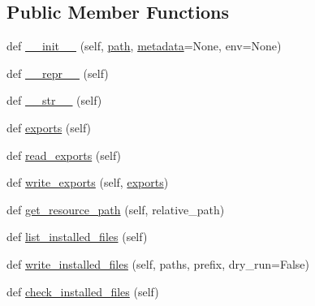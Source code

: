 \subsection*{Public Member Functions}
\begin{DoxyCompactItemize}
\item 
def \hyperlink{classpip_1_1__vendor_1_1distlib_1_1database_1_1InstalledDistribution_abbce5ce033af82ea6ee5f8986284c84b}{\+\_\+\+\_\+init\+\_\+\+\_\+} (self, \hyperlink{classpip_1_1__vendor_1_1distlib_1_1database_1_1InstalledDistribution_afb6f35086abe4dde61329963fdb46233}{path}, \hyperlink{classpip_1_1__vendor_1_1distlib_1_1database_1_1Distribution_adda9f0db4ba50d2a3b8dd421e576fb79}{metadata}=None, env=None)
\item 
def \hyperlink{classpip_1_1__vendor_1_1distlib_1_1database_1_1InstalledDistribution_a437ca097c31f9e2f6d84da428f56303d}{\+\_\+\+\_\+repr\+\_\+\+\_\+} (self)
\item 
def \hyperlink{classpip_1_1__vendor_1_1distlib_1_1database_1_1InstalledDistribution_aad3ec78be85ce6d19220e61d2026cbfc}{\+\_\+\+\_\+str\+\_\+\+\_\+} (self)
\item 
def \hyperlink{classpip_1_1__vendor_1_1distlib_1_1database_1_1InstalledDistribution_ab6c8a611e941b5927549bb03bb0a780b}{exports} (self)
\item 
def \hyperlink{classpip_1_1__vendor_1_1distlib_1_1database_1_1InstalledDistribution_ab51f5d36c452fdda77b5c98316f2b831}{read\+\_\+exports} (self)
\item 
def \hyperlink{classpip_1_1__vendor_1_1distlib_1_1database_1_1InstalledDistribution_a8089a042171558c55789b80c442fae39}{write\+\_\+exports} (self, \hyperlink{classpip_1_1__vendor_1_1distlib_1_1database_1_1InstalledDistribution_ab6c8a611e941b5927549bb03bb0a780b}{exports})
\item 
def \hyperlink{classpip_1_1__vendor_1_1distlib_1_1database_1_1InstalledDistribution_aa1b73b626d8378b922a958bd9c85f7c3}{get\+\_\+resource\+\_\+path} (self, relative\+\_\+path)
\item 
def \hyperlink{classpip_1_1__vendor_1_1distlib_1_1database_1_1InstalledDistribution_ac8334af46ee0a8db7654afeba7951647}{list\+\_\+installed\+\_\+files} (self)
\item 
def \hyperlink{classpip_1_1__vendor_1_1distlib_1_1database_1_1InstalledDistribution_a3b799b28c162cab4fd480fda0f2a852e}{write\+\_\+installed\+\_\+files} (self, paths, prefix, dry\+\_\+run=False)
\item 
def \hyperlink{classpip_1_1__vendor_1_1distlib_1_1database_1_1InstalledDistribution_af02e7290aefa70861a60fe1885285e16}{check\+\_\+installed\+\_\+files} (self)

\end{DoxyCompactItemize}
